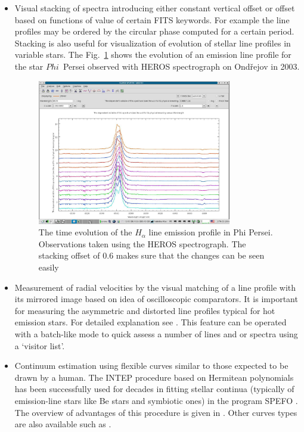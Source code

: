 \documentclass[final,authoryear,5p,times,twocolumn]{elsarticle}
\begin{document}
\begin{itemize}

\item Visual stacking of spectra introducing either constant vertical offset
  or offset based on functions of value of certain FITS keywords. For example
  the line profiles may be ordered by the circular phase computed for a
  certain period. Stacking is also useful for visualization of evolution of
  stellar line profiles in variable stars.  The
  Fig.~\ref{fig:phiper-heros-stack} shows the evolution of an emission line
  profile for the star $Phi$~Persei observed with HEROS spectrograph on
  Ond\v{r}ejov in 2003.

\begin{figure}[t]
\begin{center}
\includegraphics[width=0.8\textwidth]{phiper-heros-stack.pdf}
\caption{The time evolution of the $H_\alpha$ line emission profile in Phi Persei.
  Observations taken using the HEROS spectrograph. The stacking offset of 0.6
  makes sure that the changes can be seen easily}

\label{fig:phiper-heros-stack}
\end{center}
\end{figure}


\item Measurement of radial velocities by the visual matching of a line
  profile with its mirrored image based on idea of oscilloscopic comparators.
  It is important for measuring the asymmetric and distorted line profiles
  typical for hot emission stars. For detailed explanation see
  \citet{2007IAUS..240..486P}. This feature can be operated with a batch-like
  mode to quick assess a number of lines and or spectra using a `visitor list'.

\item Continuum estimation using flexible curves similar to those expected to
  be drawn by a human. The INTEP procedure based on Hermitean polynomials
  \citep{1982PDAO...16...67H} has been successfully used for decades in
  fitting stellar continua (typically of emission-line stars like Be stars and
  symbiotic ones) in the program SPEFO \citep{1996ASPC..101..187S}. The
  overview of advantages of this procedure is given in
  \citet{2008asvo.proc...97S}. Other curves types are also available such as
  \citet{Akima:1970:NMI:321607.321609}.


\end{itemize}
\end{document}
